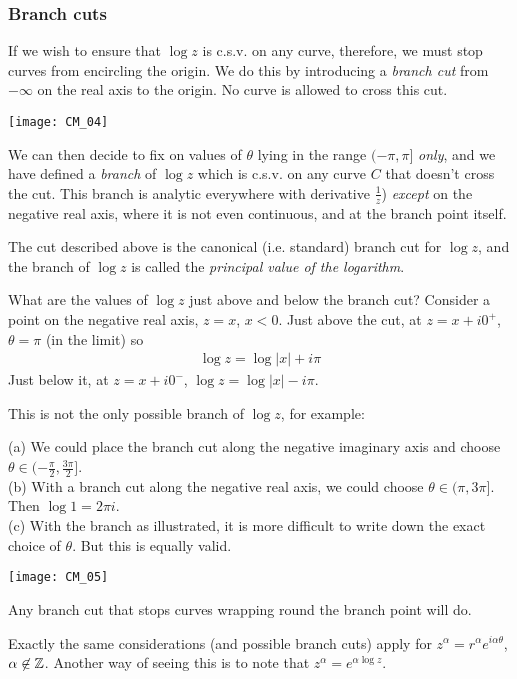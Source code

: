 \documentclass[a4paper]{article}
\begin{document}
\subsubsection{Branch cuts}
If we wish to ensure that $\log z$ is c.s.v. on any curve, therefore, we must stop curves from encircling the origin. We do this by introducing a \emph{branch cut} from $-\infty$ on the real axis to the origin. No curve is allowed to cross this cut.

\texttt{[image: CM\_04]}

We can then decide to fix on values of $\theta$ lying in the range $(-\pi,\pi]$ \emph{only}, and we have defined a \emph{branch} of $\log z$ which is c.s.v. on any curve $C$ that doesn't cross the cut. This branch is analytic everywhere with derivative $\frac{1}{z}$) \emph{except} on the negative real axis, where it is not even continuous, and at the branch point itself.

The cut described above is the canonical (i.e. standard) branch cut for $\log z$, and the branch of $\log z$ is called the \emph{principal value of the logarithm}.

What are the values of $\log z$ just above and below the branch cut? Consider a point on the negative real axis, $z=x$, $x<0$. Just above the cut, at $z=x+i0^+$, $\theta = \pi$ (in the limit) so
\begin{equation*}
\begin{aligned}
\log z = \log|x| + i\pi
\end{aligned}
\end{equation*}
Just below it, at $z=x+i0^-$, $\log z = \log |x| - i\pi$.

This is not the only possible branch of $\log z$, for example:

(a) We could place the branch cut along the negative imaginary axis and choose $\theta \in (-\frac{\pi}{2},\frac{3\pi}{2}]$.\\
(b) With a branch cut along the negative real axis, we could choose $\theta \in (\pi,3\pi]$. Then $\log 1 = 2\pi i$.\\
(c) With the branch as illustrated, it is more difficult to write down the exact choice of $\theta$. But this is equally valid.

\texttt{[image: CM\_05]}

Any branch cut that stops curves wrapping round the branch point will do.

Exactly the same considerations (and possible branch cuts) apply for $z^\alpha = r^\alpha e^{i\alpha\theta}$, $\alpha \not\in \mathbb{Z}$. Another way of seeing this is to note that $z^\alpha = e^{\alpha \log z}$.
\end{document}
